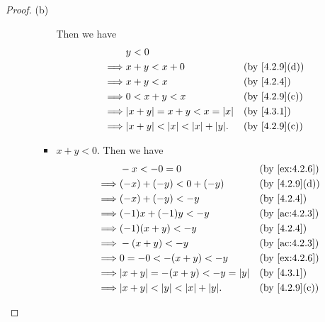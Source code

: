 \begin{proof}{(b)}
\begin{itemize}
\begin{itemize}
\begin{itemize}
                          Then we have
                          \begin{align*}
                                     & y < 0                                                                       \\
                            \implies & x + y < x + 0                              &  & \text{(by \cref{4.2.9}(d))} \\
                            \implies & x + y < x                                  &  & \by{4.2.4}                  \\
                            \implies & 0 < x + y < x                              &  & \text{(by \cref{4.2.9}(c))} \\
                            \implies & \abs{x + y} = x + y < x = \abs{x}          &  & \by{4.3.1}                  \\
                            \implies & \abs{x + y} < \abs{x} < \abs{x} + \abs{y}. &  & \text{(by \cref{4.2.9}(c))}
                          \end{align*}
                    \item \(x + y < 0\).
                          Then we have
                          \begin{align*}
                                     & -x < -0 = 0                                &  & \by{ex:4.2.6}               \\
                            \implies & (-x) + (-y) < 0 + (-y)                     &  & \text{(by \cref{4.2.9}(d))} \\
                            \implies & (-x) + (-y) < -y                           &  & \by{4.2.4}                  \\
                            \implies & (-1)x + (-1)y < -y                         &  & \by{ac:4.2.3}               \\
                            \implies & (-1)(x + y) < -y                           &  & \by{4.2.4}                  \\
                            \implies & -(x + y) < -y                              &  & \by{ac:4.2.3}               \\
                            \implies & 0 = -0 < -(x + y) < -y                     &  & \by{ex:4.2.6}               \\
                            \implies & \abs{x + y} = -(x + y) < -y = \abs{y}      &  & \by{4.3.1}                  \\
                            \implies & \abs{x + y} < \abs{y} < \abs{x} + \abs{y}. &  & \text{(by \cref{4.2.9}(c))}

\end{align*}
\end{itemize}
\end{itemize}
\end{itemize}
\end{proof}
